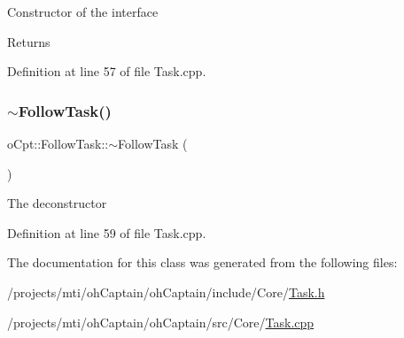 Constructor of the interface \begin{DoxyReturn}{Returns}

\end{DoxyReturn}


Definition at line 57 of file Task.\+cpp.

\hypertarget{classo_cpt_1_1_follow_task_ab93d2570c1e65704f6742aa5f3f6a440}{}\label{classo_cpt_1_1_follow_task_ab93d2570c1e65704f6742aa5f3f6a440} 
\subsubsection{\texorpdfstring{$\sim$\+Follow\+Task()}{~FollowTask()}}
{\footnotesize\ttfamily o\+Cpt\+::\+Follow\+Task\+::$\sim$\+Follow\+Task (\begin{DoxyParamCaption}{ }\end{DoxyParamCaption})\hspace{0.3cm}{\ttfamily [virtual]}}

The deconstructor 

Definition at line 59 of file Task.\+cpp.



The documentation for this class was generated from the following files\+:\begin{DoxyCompactItemize}
\item 
/projects/mti/oh\+Captain/oh\+Captain/include/\+Core/\hyperlink{_task_8h}{Task.\+h}\item 
/projects/mti/oh\+Captain/oh\+Captain/src/\+Core/\hyperlink{_task_8cpp}{Task.\+cpp}\end{DoxyCompactItemize}
